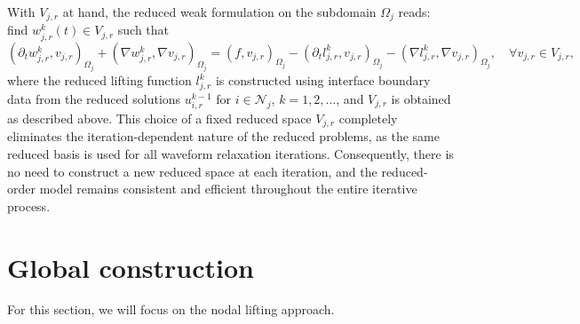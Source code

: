 \documentclass[a4paper, 11pt]{article}
\theoremstyle{remark}
\begin{document}
\vspace{10pt}
\noindent With $V_{j,r}$ at hand, the reduced weak formulation on the subdomain $\Omega_j$ reads: find $w_{j, r}^{k}(t) \in V_{j, r}$ such that
\begin{equation*}
    \left(\partial_{t} w_{j, r}^{k}, v_{j, r}\right)_{\Omega_{j}} + \left(\nabla w_{j, r}^{k}, \nabla v_{j, r}\right)_{\Omega_{j}} = \left(f, v_{j, r}\right)_{\Omega_{j}} - \left(\partial_{t} l_{j, r}^{k}, v_{j, r}\right)_{\Omega_{j}} - \left(\nabla l_{j, r}^{k}, \nabla v_{j, r}\right)_{\Omega_{j}}, \quad\forall v_{j, r}\in V_{j, r},
\end{equation*}
where the reduced lifting function $l_{j,r}^{k}$ is constructed using interface boundary data from the reduced solutions $u_{i,r}^{k-1}$ for $i \in \mathcal{N}_j$, $k = 1,2,\dots$, and $V_{j,r}$ is obtained as described above. This choice of a fixed reduced space $V_{j,r}$ completely eliminates the iteration-dependent nature of the reduced problems, as the same reduced basis is used for all waveform relaxation iterations. Consequently, there is no need to construct a new reduced space at each iteration, and the reduced-order model remains consistent and efficient throughout the entire iterative process.

\section{Global construction}
For this section, we will focus on the nodal lifting approach.
\end{document}
